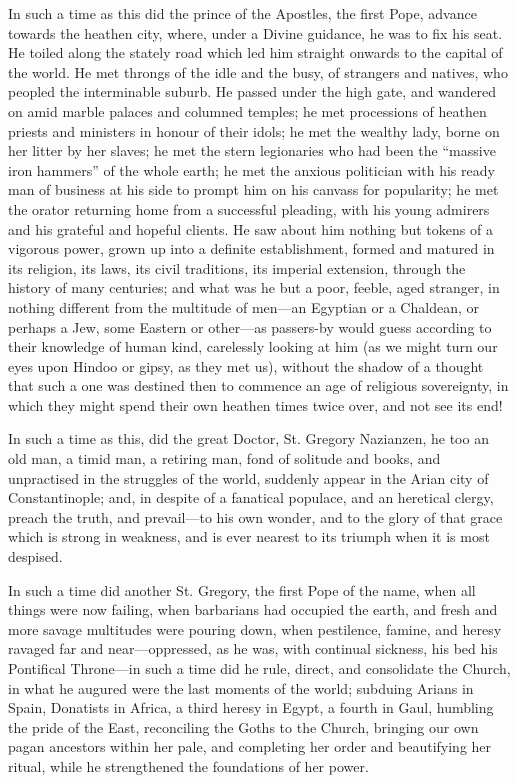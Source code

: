In such a time as this did the prince of the Apostles, the first
Pope, advance towards the heathen city, where, under a Divine
guidance, he was to fix his seat. He toiled along the stately road
which led him straight onwards to the capital of the world. He met
throngs of the idle and the busy, of strangers and natives, who
peopled the interminable suburb. He passed under the high gate, and
wandered on amid marble palaces and columned temples; he met
processions of heathen priests and ministers in honour of their idols;
he met the wealthy lady, borne on her litter by her slaves; he met the
stern legionaries who had been the ``massive iron hammers'' of
the whole earth; he met the anxious politician with his ready man of
business at his side to prompt him on his canvass for popularity; he
met the orator returning home from a successful pleading, with his
young admirers and his grateful and hopeful clients. He saw about him
nothing but tokens of a vigorous power, grown up into a definite
establishment, formed and matured in its religion, its laws, its civil
traditions, its imperial extension, through the history of many
centuries; and what was he but a poor, feeble, aged stranger, in
nothing different from the multitude of men—an Egyptian or a
Chaldean, or perhaps a Jew, some Eastern or other—as passers-by
would guess according to their knowledge of human kind, carelessly
looking at him (as we might turn our eyes upon Hindoo or gipsy, as
they met us), without the shadow of a thought that such a one was
destined then to commence an age of religious sovereignty, in which
they might spend their own heathen times twice over, and not see its
end!

In such a time as this, did the great Doctor, St. Gregory Nazianzen,
he too an old man, a timid man, a retiring man, fond of solitude and
books, and unpractised in the struggles of the world, suddenly appear
in the Arian city of Constantinople; and, in despite of a fanatical
populace, and an heretical clergy, preach the truth, and prevail—to
his own wonder, and to the glory of that grace which is strong in
weakness, and is ever nearest to its triumph when it is most despised.

In such a time did another St. Gregory, the first Pope of the name,
when all things were now failing, when barbarians had occupied the
earth, and fresh and more savage multitudes were pouring down, when
pestilence, famine, and heresy ravaged far and near—oppressed, as he
was, with continual sickness, his bed his Pontifical Throne—in such
a time did he rule, direct, and consolidate the Church, in what he
augured were the last moments of the world; subduing Arians in Spain,
Donatists in Africa, a third heresy in Egypt, a fourth in Gaul,
humbling the pride of the East, reconciling the Goths to the Church,
bringing our own pagan ancestors within her pale, and completing her
order and beautifying her ritual, while he strengthened the
foundations of her power.

